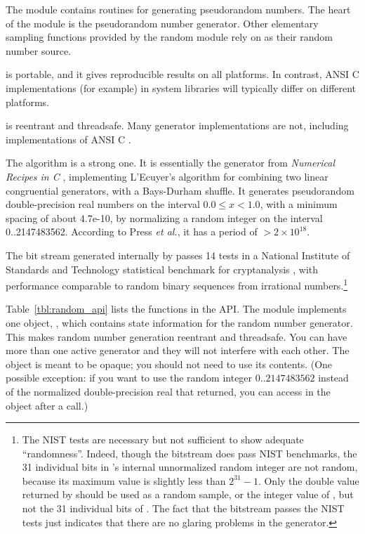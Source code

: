 The  module contains routines for generating
pseudorandom numbers. The heart of the module is the
 pseudorandom number generator. Other elementary
sampling functions provided by the random module rely on
 as their random number source.

 is portable, and it gives reproducible results
on all platforms. In contrast, ANSI C  implementations
(for example) in system libraries will typically differ on different
platforms.

 is reentrant and threadsafe. Many generator
implementations are not, including implementations of ANSI C
.

The  algorithm is a strong one. It is essentially
the  generator from \emph{Numerical Recipes in C}
\citep{Press93}, implementing L'Ecuyer's algorithm for combining two
linear congruential generators, with a Bays-Durham shuffle. It
generates pseudorandom double-precision real numbers on the interval
$0.0 \leq x < 1.0$, with a minimum spacing of about 4.7e-10, by
normalizing a random integer on the interval 0..2147483562.  According
to Press \emph{et al.}, it has a period of $> 2 \times
10^{18}$. 

The bit stream generated internally by  passes 14
tests in a National Institute of Standards and Technology statistical
benchmark for cryptanalysis \citep{Rukhin01}, with performance
comparable to random binary sequences from irrational
numbers.\footnote{The NIST tests are necessary but not sufficient to
show adequate ``randomness''. Indeed, though the bitstream does pass
NIST benchmarks, the 31 individual bits in 's
internal unnormalized random integer are not random, because its
maximum value is slightly less than $2^{31}-1$. Only the double value
returned by  should be used as a random sample,
or the integer value of , but not the 31 individual bits
of .  The fact that the bitstream passes the NIST tests
just indicates that there are no glaring problems in the generator.}

Table~\ref{tbl:random_api} lists the functions in the 
API. The module implements one object, , which
contains state information for the random number generator.  This
makes random number generation reentrant and threadsafe. You can have
more than one active generator and they will not interfere with each
other. The object is meant to be opaque; you should not need to use
its contents.  (One possible exception: if you want to use the random
integer $0..2147483562$ instead of the normalized double-precision
real that  returned, you can access
 in the  object  after a
 call.)

